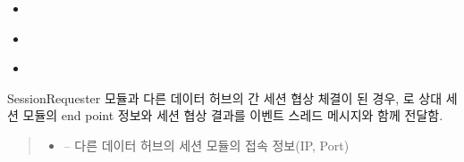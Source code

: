 \documentclass[a4paper,10pt,english]{sphinxmanual}
\begin{document}
\begin{fulllineitems}
\begin{fulllineitems}
\begin{itemize}
\item {} 
\sphinxAtStartPar
{\hyperref[\detokenize{_SessionManager:SessionManager._srGetNewSessionInfo}]{}}

\item {} 
\sphinxAtStartPar
{\hyperref[\detokenize{_SessionManager:SessionManager._srUpdateInterestList}]{}}

\item {} 
\sphinxAtStartPar
{\hyperref[\detokenize{_SessionManager:SessionManager._srUpdateNegotiationOptions}]{}}

\end{itemize}



\end{fulllineitems}


\begin{fulllineitems}
\label{\detokenize{_SessionRequester:SessionRequester._smTransmitNegotiationResult}}
\pysigstartsignatures
{}
\pysigstopsignatures
\sphinxAtStartPar
SessionRequester 모듈과 다른 데이터 허브의 {\hyperref[\detokenize{_SessionListener:sessionlistener}]{}} 간 세션 협상 체결이 된 경우,
{\hyperref[\detokenize{_SessionManager:sessionmanager}]{}} 로 상대 세션 모듈의 end point 정보와 세션 협상 결과를  이벤트 스레드 메시지와 함께 전달함.
\begin{quote}\begin{description}
\begin{itemize}
\item {} 
\sphinxAtStartPar
{} – 다른 데이터 허브의 세션 모듈의 접속 정보(IP, Port)


\end{itemize}
\end{description}
\end{quote}
\end{fulllineitems}
\end{fulllineitems}
\end{document}

